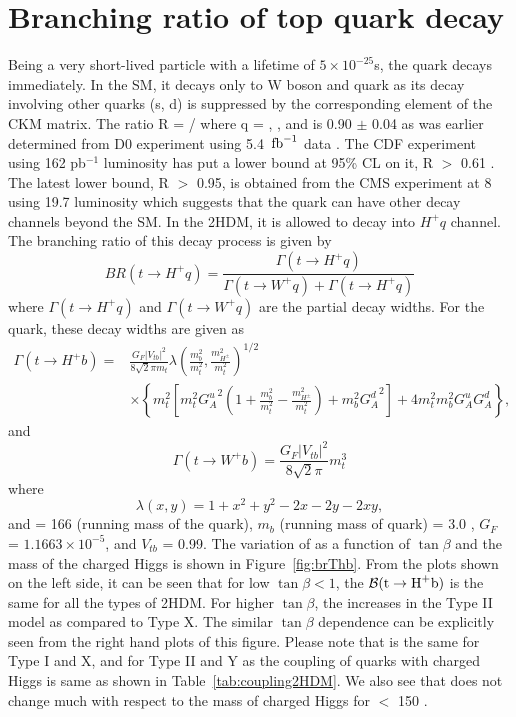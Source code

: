 \section{Branching ratio of top quark decay}
\label{s:brThb}
Being a very short-lived particle with a lifetime of $5\times 10^{-25}$\unit{s}, the
\PQt quark decays immediately. In the SM, it decays only to W boson
and \PQb quark as its decay involving other quarks (s, d) is suppressed
by the corresponding element of the CKM matrix. The ratio R = \brTwb/\brTwq 
where q = \PQb, \PQs, and \PQd is 0.90 $\pm$ 0.04 as was earlier 
determined from D0 experiment using 5.4 $\mbox{\ensuremath{\,\text{fb}^{-1}}}$ 
data \cite{PhysRevLett.107.121802}. The CDF experiment using 162 
pb$^{-1}$ luminosity has put a lower bound at 95\% CL on it, 
R $>$ 0.61 \cite{PhysRevLett.95.102002}. The latest lower bound, R $>$ 
0.95, is obtained from the CMS experiment at 8 \TeV using 19.7\fbinv 
luminosity \cite{Khachatryan:2014nda}  which suggests that the \PQt 
quark can have other decay channels beyond the SM. In the 2HDM, it is allowed to 
decay into $H^+q$ channel. The branching ratio of this decay process is given by
\begin{equation}
BR(t\to H^+q) = \frac{\Gamma(t\to H^+q)}{\Gamma(t\to W^+q)+\Gamma(t\to H^+q)}
\label{eq:brThb}
\end{equation}
where $\Gamma(t\to H^+q)$ and $\Gamma(t\to W^+q)$ are the partial decay widths. 
For the \PQb quark, these decay widths are given as \cite{PhysRevD.80.015017}
\begin{align}
\Gamma(t\to H^+b) =&
\frac{G_F\left|V_{tb}\right|^2}{8\sqrt2\pi m_t}
\lambda\left(\frac{m_b^2}{m_t^2},\frac{m_{H^\pm}^2}{m_t^2}\right)^{1/2}
\nonumber\\
&\times
\left\{m_t^2\left[m_t^2{G_A^u}^2\left(1+\frac{m_b^2}{m_t^2}-\frac{m_{H^\pm}^2}{m_t^2}\right)+m_b^2{G_A^d}^2\right]
+4m_t^2m_b^2G_A^uG_A^d\right\},
\end{align}
and 
\begin{equation}
\Gamma(t\to W^+b) = \frac{G_F\left|V_{tb}\right|^2}{8\sqrt2\pi}m_t^3
\end{equation}
where
\begin{equation}
\lambda(x,y) = 1+x^2+y^2-2x-2y-2xy,
\end{equation}
and \mt = 166 \GeV (running mass of the \PQt quark), $m_b$ (running mass of \PQb quark) = 3.0 \GeV, $G_{F}$ = 
$1.1663\times 10^{-5}$, and $V_{tb}$ = 0.99. The variation of \brThb as 
a function of $\tan\beta$ and the mass of the charged Higgs is shown in Figure~\ref{fig:brThb}. 
From the plots shown on the left side, it can be seen that for low $\tan\beta < 1$, the $\mathcal{B}(\text{t} \rightarrow \text{H}^+ \text{b})$ is 
the same for all the types 
of 2HDM. For higher $\tan\beta$, the \brThb increases in the Type II model as compared to Type X.
The similar $\tan\beta$ dependence can be explicitly seen from the right hand plots of this figure. 
Please note that \brThb is the same for Type I and X, and for Type II and Y as the coupling 
of quarks with charged Higgs is same as shown in Table~\ref{tab:coupling2HDM}. 
We also see that \brThb does not change much with respect to the mass of charged Higgs
for \mHp $<$ 150 \GeV.

